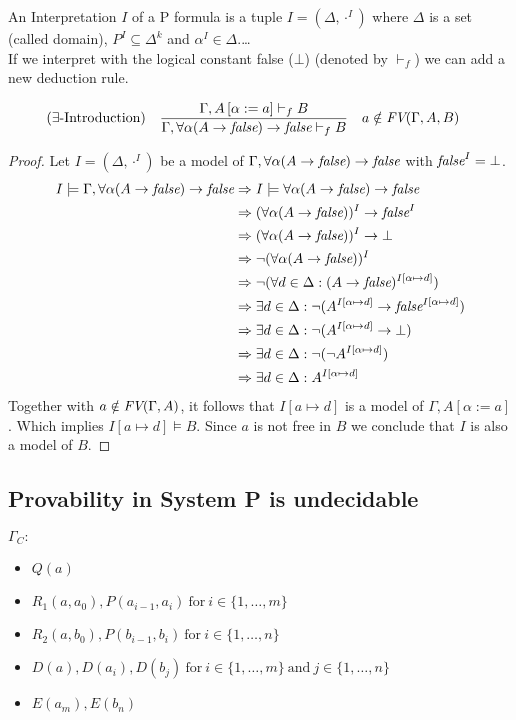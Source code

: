 An Interpretation $I$ of a P formula is a tuple $I=(\Delta,\cdot^I)$ where $\Delta$ is a set (called domain), $P^I\subseteq\Delta^k$ and $\alpha^I\in\Delta$.\dots\\
If we interpret \false{} with the logical constant false ($\bot$) (denoted by $\vdash_f$) we can add a new deduction rule.
\begin{mdframed}
\begin{align*}
&(\exists\text{-Introduction}) &&\frac
{\Gamma,A\left[\alpha:=a\right]\vdash_f B}
{\Gamma,\forall\alpha(A\to\emph{false})\to\emph{false}\vdash_f B} && a\notin\emph{FV}(\Gamma,A,B)
\end{align*}
\end{mdframed}
\begin{proof}
Let $I=(\Delta,\cdot^I)$ be a model of $\Gamma,\forall\alpha(A\to\emph{false})\to\emph{false}$ with $\emph{false}^I=\bot$.
\begin{align*}
I\models\Gamma,\forall\alpha(A\to\emph{false})\to\emph{false}&\Rightarrow I\models\forall\alpha(A\to\emph{false})\to\emph{false}\\
&\Rightarrow (\forall\alpha(A\to\emph{false}))^I\to\emph{false}^I\\
&\Rightarrow (\forall\alpha(A\to\emph{false}))^I\to\bot\\
&\Rightarrow \neg(\forall\alpha(A\to\emph{false}))^I\\
&\Rightarrow \neg(\forall d\in\Delta:(A\to\emph{false})^{I\left[\alpha\mapsto d\right]})\\
&\Rightarrow \exists d\in\Delta:\neg(A^{I\left[\alpha\mapsto d\right]}\to\emph{false}^{I\left[\alpha\mapsto d\right]})\\
&\Rightarrow \exists d\in\Delta:\neg(A^{I\left[\alpha\mapsto d\right]}\to\bot)\\
&\Rightarrow \exists d\in\Delta:\neg(\neg A^{I\left[\alpha\mapsto d\right]})\\
&\Rightarrow \exists d\in\Delta:A^{I\left[\alpha\mapsto d\right]}\\
\end{align*}
Together with $a\notin\emph{FV}(\Gamma,A)$, it follows that $I\left[a\mapsto d\right]$ is a model of $\Gamma,A\left[\alpha:=a\right]$. Which implies $I\left[a\mapsto d\right]\models B$.	Since $a$ is not free in $B$ we conclude that $I$ is also a model of $B$.
\end{proof}
\subsection{Provability in System P is undecidable}
$\Gamma_C:$
\begin{itemize}
\item $Q(a)$
\item $R_1(a,a_0),P(a_{i-1},a_i)~\text{for}~i\in\{1,\dots,m\}$
\item $R_2(a,b_0),P(b_{i-1},b_i)~\text{for}~i\in\{1,\dots,n\}$
\item $D(a),D(a_i),D(b_j)~\text{for}~i\in\{1,\dots,m\}~\text{and}~j\in\{1,\dots,n\}$
\item $E(a_m),E(b_n)$
\end{itemize}

